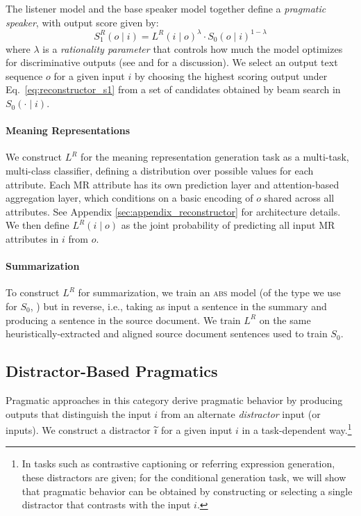 \documentclass[11pt,a4paper]{article}
\newcommand{\basespk}[0]{$S_0$\xspace}
\newcommand{\distr}[0]{\ensuremath\widetilde\imath}
\newcommand{\ie}{i.e., }
\begin{document}
The listener model and the base speaker model together define a \emph{pragmatic speaker}, with output score given by:
\begin{equation}
\label{eq:reconstructor_s1}
S_1^R(o \mid i) = L^R(i \mid o)^{\lambda} \cdot S_0(o \mid i)^{1 - \lambda}
\end{equation}
where $\lambda$ is a \emph{rationality parameter} that controls how much the model optimizes for discriminative outputs (see \citet{monroe2017colors} and \citet{fried2017unified} for a discussion). We select an output text sequence $o$ for a given input $i$ by choosing the highest scoring output under Eq.\ \ref{eq:reconstructor_s1} from a set of candidates obtained by beam search in $S_0(\cdot \mid i)$.



\paragraph{Meaning Representations}
We construct $L^R$ for the meaning representation generation task as a multi-task, multi-class classifier, defining a distribution over possible values for each attribute.
Each MR attribute has its own prediction layer and attention-based aggregation layer, which conditions on
a basic encoding of $o$ shared across all attributes.
See Appendix \ref{sec:appendix_reconstructor} for architecture details.
We then define $L^R(i\mid o)$ as the joint probability of predicting all input MR attributes in $i$ from $o$.


\paragraph{Summarization}
To construct $L^R$ for summarization, we train an \textsc{abs} model (of the type we use for \basespk, \citet{chen2018fast}) but in reverse, \ie taking as input a sentence in the summary and producing a sentence in the source document. We train $L^R$ on the same heuristically-extracted and aligned source document sentences used to train \basespk \cite{chen2018fast}. 




\subsection{Distractor-Based Pragmatics}
\label{sec:pragd}
Pragmatic approaches in this category \cite{frank2012predicting,Andreas16Pragmatics,vedantam2017captions,cohn2018pragmatically} derive pragmatic behavior by producing outputs that distinguish the input $i$ from an alternate \emph{distractor} input (or inputs). 
We construct a distractor $\distr$ for a given input $i$ in a task-dependent way.\footnote{In tasks such as contrastive captioning or referring expression generation, these distractors are given; for the conditional generation task, we will show that pragmatic behavior can be obtained 
by constructing or selecting a single distractor that contrasts with the input $i$.}
\end{document}
